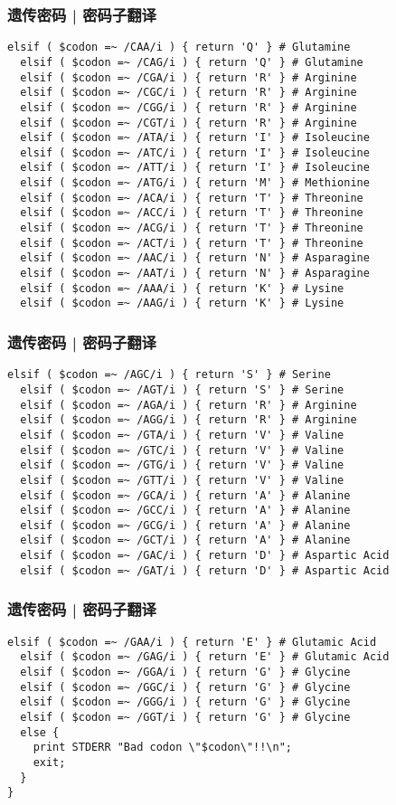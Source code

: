 \begin{frame}[fragile]
  \frametitle{遗传密码 | 密码子翻译}
\begin{lstlisting}[firstnumber=34,basicstyle=\footnotesize\tt,numberstyle=\scriptsize]
  elsif ( $codon =~ /CAA/i ) { return 'Q' } # Glutamine
  elsif ( $codon =~ /CAG/i ) { return 'Q' } # Glutamine
  elsif ( $codon =~ /CGA/i ) { return 'R' } # Arginine
  elsif ( $codon =~ /CGC/i ) { return 'R' } # Arginine
  elsif ( $codon =~ /CGG/i ) { return 'R' } # Arginine
  elsif ( $codon =~ /CGT/i ) { return 'R' } # Arginine
  elsif ( $codon =~ /ATA/i ) { return 'I' } # Isoleucine
  elsif ( $codon =~ /ATC/i ) { return 'I' } # Isoleucine
  elsif ( $codon =~ /ATT/i ) { return 'I' } # Isoleucine
  elsif ( $codon =~ /ATG/i ) { return 'M' } # Methionine
  elsif ( $codon =~ /ACA/i ) { return 'T' } # Threonine
  elsif ( $codon =~ /ACC/i ) { return 'T' } # Threonine
  elsif ( $codon =~ /ACG/i ) { return 'T' } # Threonine
  elsif ( $codon =~ /ACT/i ) { return 'T' } # Threonine
  elsif ( $codon =~ /AAC/i ) { return 'N' } # Asparagine
  elsif ( $codon =~ /AAT/i ) { return 'N' } # Asparagine
  elsif ( $codon =~ /AAA/i ) { return 'K' } # Lysine
  elsif ( $codon =~ /AAG/i ) { return 'K' } # Lysine
\end{lstlisting}
\end{frame}

\begin{frame}[fragile]
  \frametitle{遗传密码 | 密码子翻译}
\begin{lstlisting}[firstnumber=52,basicstyle=\footnotesize\tt,numberstyle=\scriptsize]
  elsif ( $codon =~ /AGC/i ) { return 'S' } # Serine
  elsif ( $codon =~ /AGT/i ) { return 'S' } # Serine
  elsif ( $codon =~ /AGA/i ) { return 'R' } # Arginine
  elsif ( $codon =~ /AGG/i ) { return 'R' } # Arginine
  elsif ( $codon =~ /GTA/i ) { return 'V' } # Valine
  elsif ( $codon =~ /GTC/i ) { return 'V' } # Valine
  elsif ( $codon =~ /GTG/i ) { return 'V' } # Valine
  elsif ( $codon =~ /GTT/i ) { return 'V' } # Valine
  elsif ( $codon =~ /GCA/i ) { return 'A' } # Alanine
  elsif ( $codon =~ /GCC/i ) { return 'A' } # Alanine
  elsif ( $codon =~ /GCG/i ) { return 'A' } # Alanine
  elsif ( $codon =~ /GCT/i ) { return 'A' } # Alanine
  elsif ( $codon =~ /GAC/i ) { return 'D' } # Aspartic Acid
  elsif ( $codon =~ /GAT/i ) { return 'D' } # Aspartic Acid
\end{lstlisting}
\end{frame}

\begin{frame}[fragile]
  \frametitle{遗传密码 | 密码子翻译}
\begin{lstlisting}[firstnumber=66,basicstyle=\footnotesize\tt,numberstyle=\scriptsize]
  elsif ( $codon =~ /GAA/i ) { return 'E' } # Glutamic Acid
  elsif ( $codon =~ /GAG/i ) { return 'E' } # Glutamic Acid
  elsif ( $codon =~ /GGA/i ) { return 'G' } # Glycine
  elsif ( $codon =~ /GGC/i ) { return 'G' } # Glycine
  elsif ( $codon =~ /GGG/i ) { return 'G' } # Glycine
  elsif ( $codon =~ /GGT/i ) { return 'G' } # Glycine
  else {
    print STDERR "Bad codon \"$codon\"!!\n";
    exit;
  }
}
\end{lstlisting}
\end{frame}

